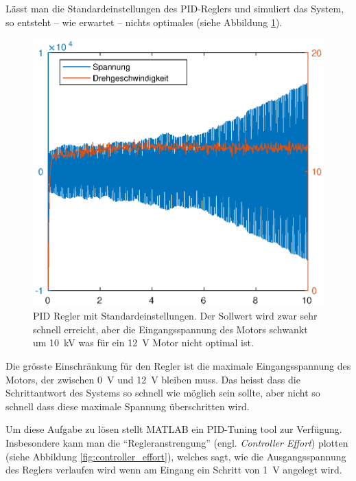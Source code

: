 L\"asst  man  die Standardeinstellungen  des  PID-Reglers  und  simuliert  das
System, so entsteht --  wie  erwartet  --  nichts  optimales  (siehe Abbildung
\ref{fig:PID_initial}).

\begin{figure}
    \centering
    \includegraphics[width=\imagewidth]{images/PID_initial}
    \caption{PID Regler mit Standardeinstellungen. Der Sollwert wird zwar sehr schnell erreicht, aber die Eingangsspannung des Motors schwankt um \SI{10}{\kilo\volt} was f\"ur ein \SI{12}{\volt} Motor nicht optimal ist.}
    \label{fig:PID_initial}
\end{figure}

Die   gr\"osste   Einschr\"ankung   f\"ur   den  Regler   ist   die   maximale
Eingangsspannung des  Motors,  der  zwischen  \SI{0}{\volt} und \SI{12}{\volt}
bleiben muss. Das heisst dass die  Schrittantwort  des  Systems so schnell wie
m\"oglich  sein  sollte,  aber  nicht  so schnell dass diese maximale Spannung
\"uberschritten wird.

Um diese Aufgabe zu l\"osen stellt MATLAB ein PID-Tuning tool zur Verf\"ugung.
Insbesondere  kann  man  die  ``Regleranstrengung''  (engl. \textit{Controller
Effort}) plotten (siehe Abbildung \ref{fig:controller_effort}),  welches sagt,
wie  die  Ausgangsspannung des Reglers verlaufen  wird  wenn  am  Eingang  ein
Schritt von \SI{1}{\volt} angelegt wird.

